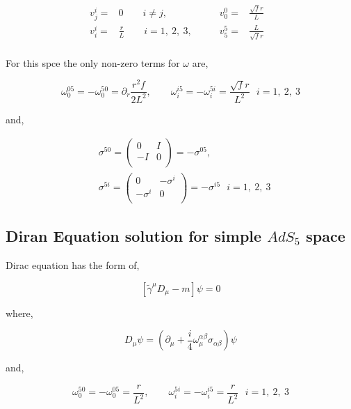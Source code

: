 \begin{align}
   v^{i}_{j} =& 0 \qquad i \neq j,&    \qquad  v^{0}_{0} =& \frac{\sqrt{f}r}{L}& \nonumber\\
   v^{i}_{i} =& \frac{r}{L}  \qquad i = 1,~2,~3,& \qquad v^{5}_{5} =& \frac{L}{\sqrt{f}r}& \nonumber\\
\end{align}

For this spce the only non-zero terms for $\omega$ are,

\begin{equation}
   \omega^{05}_{0} = -\omega^{50}_{0} = \partial_r \frac{r^2f}{2L^2}, \qquad 
   \omega^{i5}_{i} = -\omega^{5i}_{i} = \frac{\sqrt{f}r}{L^2} ~~~ i=1,~2,~3
\end{equation}

and,

\begin{align} \label{eq:GammaMetricesMinkowski5d}
   &\sigma^{50} = \begin{pmatrix} 0 & I \\ -I & 0 \\ \end{pmatrix} = -\sigma^{05}, \quad \nonumber\\
   &\sigma^{5i} = \begin{pmatrix} 0 & -\sigma^i \\ -\sigma^i & 0 \\ \end{pmatrix}= -\sigma^{i5} ~~~ i=1,~2,~3 
\end{align}

\subsection{Diran Equation solution for simple $AdS_5$ space}

Dirac equation has the form of,

\begin{equation}
   \left[\tilde{\gamma}^{\mu}D_{\mu} - m\right]\psi = 0
\end{equation}

where,

\begin{equation}
   D_{\mu} \psi = \left(\partial_{\mu} + \frac{i}{4}\omega^{\alpha\beta}_{\mu}\sigma_{\alpha\beta}\right) \psi
\end{equation}

and,

\begin{equation}
   \omega^{50}_{0} = -\omega^{05}_{0} = \frac{r}{L^2}, \qquad 
   \omega^{5i}_{i} = -\omega^{i5}_{i} = \frac{r}{L^2} ~~~ i=1,~2,~3
\end{equation}

